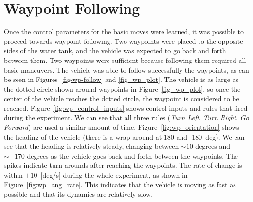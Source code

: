 \newpage

\section{Waypoint Following}
\label{sec-wp-follwing}

Once the control parameters for the basic moves were learned, it was possible to proceed towards waypoint following. Two waypoints were placed to the opposite sides of the water tank, and the vehicle was expected to go back and forth between them. Two waypoints were sufficient because following them required all basic maneuvers. The vehicle was able to follow successfully the waypoints, as can be seen in Figures~\ref{fig-wp-follow} and \ref{fig_wp_plot}. The vehicle is as large as the dotted circle shown around waypoints in Figure~\ref{fig_wp_plot}, so once the center of the vehicle reaches the dotted circle, the waypoint is considered to be reached. Figure~\ref{fig:wp_control_inputs} shows control inputs and rules that fired during the experiment. We can see that all three rules (\textit{Turn Left}, \textit{Turn Right}, \textit{Go Forward}) are used a similar amount of time. Figure~\ref{fig:wp_orientation} shows the heading of the vehicle (there is a wrap-around at 180 and -180~deg). We can see that the heading is relatively steady, changing between $\sim10$ degrees and $\sim-170$ degrees as the vehicle goes back and forth between the waypoints. The spikes indicate turn-arounds after reaching the waypoints. The rate of change is within $\pm10$~[deg/s] during the whole experiment, as shown in Figure~\ref{fig:wp_ang_rate}. This indicates that the vehicle is moving as fast as possible and that its dynamics are relatively slow.

